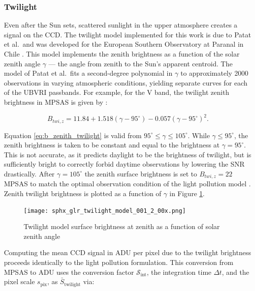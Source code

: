 \subsubsection{Twilight}

Even after the Sun sets, scattered sunlight in the upper atmosphere creates a signal on the CCD. The twilight model implemented for this work is due to Patat et al.\ and was developed for the European Southern Observatory at Paranal in Chile \cite{patat2006}. This model implements the zenith brightness as a function of the solar zenith angle $\gamma$ --- the angle from zenith to the Sun's apparent centroid. The model of Patat et al.\ fits a second-degree polynomial in $\gamma$ to approximately 2000 observations in varying atmospheric conditions, yielding separate curves for each of the UBVRI passbands. For example, for the V band, the twilight zenith brightness in MPSAS is given by \cite{patat2006}:

\begin{equation} \label{eq:b_zenith_twilight}
  B_{twi,z} = 11.84 + 1.518(\gamma - 95^\circ) - 0.057 (\gamma -  95^\circ)^2.
\end{equation}

Equation \ref{eq:b_zenith_twilight} is valid from $95^\circ \leq \gamma \leq 105^\circ$. While $\gamma \le 95^\circ$, the zenith brightness is taken to be constant and equal to the brightness at $\gamma = 95^\circ$. This is not accurate, as it predicts daylight to be the brightness of twilight, but is sufficiently bright to correctly forbid daytime observations by lowering the SNR drastically. After $\gamma = 105^\circ$ the zenith surface brightness is set to $B_{twi,z} = 22$ MPSAS to match the optimal observation condition of the light pollution model \cite{krag2003}. Zenith twilight brightness is plotted as a function of $\gamma$ in Figure \ref{fig:twilight_model}.

\begin{figure}[ht]
  \centering
  \texttt{[image: sphx\_glr\_twilight\_model\_001\_2\_00x.png]}
  \caption{Twilight model surface brightness at zenith as a function of solar zenith angle}
  \label{fig:twilight_model}
\end{figure}

Computing the mean CCD signal in ADU per pixel due to the twilight brightness proceeds identically to the light pollution formulation. This conversion from MPSAS to ADU uses the conversion factor $\mathcal{S}_\mathrm{int}$, the integration time $\Delta t$, and the pixel scale $s_\mathrm{pix}$, as $\bar{S}_\mathrm{twilight}$ via:

